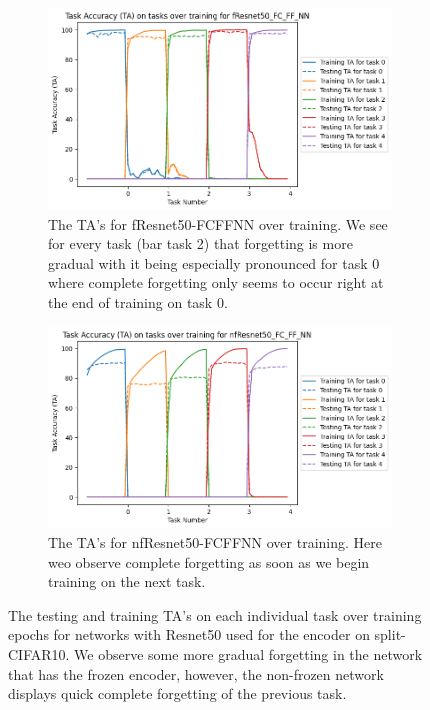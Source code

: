 \begin{figure}[ht]
  \centering
  \begin{subfigure}[t]{0.4\textwidth}
     \includegraphics[width=\linewidth]{images/CIFAR10_CL/fResnet50_FC_FF_NN_TA_task.png}
     \caption{The TA's for fResnet50-FCFFNN over training. We see for every task (bar task 2) that forgetting is more gradual with it being especially pronounced for task 0 where complete forgetting only seems to occur right at the end of training on task 0.}
  \end{subfigure}
  \quad %
  \begin{subfigure}[t]{0.4\textwidth}
     \includegraphics[width=\linewidth]{images/CIFAR10_CL/nfResnet50_FC_FF_NN_TA_task.png}
     \caption{The TA's for nfResnet50-FCFFNN over training. Here weo observe complete forgetting as soon as we begin training on the next task.}
  \end{subfigure}

  \caption{The testing and training TA's on each individual task over training epochs for networks with Resnet50 used for the encoder on split-CIFAR10. We observe some more gradual forgetting in the network that has the frozen encoder, however, the non-frozen network displays quick complete forgetting of the previous task.}
  \label{fig:CIFAR10-R50-TA}
\end{figure}


